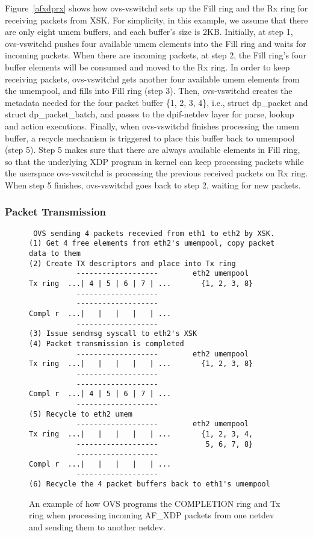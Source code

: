 \documentclass[10pt,numbers,reprint]{sigplanconf}
\begin{document}
Figure~\ref{afxdprx} shows how ovs-vswitchd sets up the Fill ring and
the Rx ring for receiving packets from XSK.  For simplicity, in this example,
we assume that there are only eight umem buffers, and each buffer's
size is 2KB.  Initially, at step 1, ovs-vswitchd pushes four available umem
elements into
the Fill ring and waits for incoming packets.  When there are incoming packets,
at step 2, the Fill ring's four buffer elements will be consumed and moved
to the Rx ring.  In order to keep receiving packets, ovs-vswitchd gets another
four available umem elements from the umempool, and fills into Fill ring (step 3).
Then, ovs-vswitchd creates the metadata needed for the four packet
buffer \{1, 2, 3, 4\}, i.e., struct dp\_packet and struct dp\_packet\_batch, and passes to 
the dpif-netdev layer for parse, lookup and action executions.
Finally, when ovs-vswitchd finishes processing the umem buffer, a recycle
mechanism is triggered to place this buffer back to umempool (step 5).
Step 5 makes sure that there are always available elements in Fill ring, so
that the underlying XDP program in kernel can keep processing packets 
while the userspace ovs-vswitchd is processing the previous
received packets on Rx ring.
When step 5 finishes, ovs-vswitchd goes back to step 2, waiting for
new packets.

\subsubsection{Packet Transmission}
\begin{figure}
{\scriptsize
\begin{verbatim}
 OVS sending 4 packets recevied from eth1 to eth2 by XSK.
(1) Get 4 free elements from eth2's umempool, copy packet data to them
(2) Create TX descriptors and place into Tx ring
           -------------------        eth2 umempool
Tx ring  ...| 4 | 5 | 6 | 7 | ...       {1, 2, 3, 8}
           -------------------
           -------------------
Compl r  ...|   |   |   |   | ...
           -------------------
(3) Issue sendmsg syscall to eth2's XSK
(4) Packet transmission is completed
           -------------------        eth2 umempool
Tx ring  ...|   |   |   |   | ...       {1, 2, 3, 8}
           -------------------
           -------------------
Compl r  ...| 4 | 5 | 6 | 7 | ...
           -------------------
(5) Recycle to eth2 umem
           -------------------        eth2 umempool
Tx ring  ...|   |   |   |   | ...       {1, 2, 3, 4,
           -------------------           5, 6, 7, 8}
           -------------------
Compl r  ...|   |   |   |   | ...
           -------------------
(6) Recycle the 4 packet buffers back to eth1's umempool
\end{verbatim}
}
\vspace{-1.0em}
\caption{An example of how OVS programs the COMPLETION ring and Tx ring when
processing incoming AF\_XDP packets from one netdev and sending them to another
netdev.}
\label{afxdptx}
\vspace{-1.0em}
\end{figure}
\end{document}
